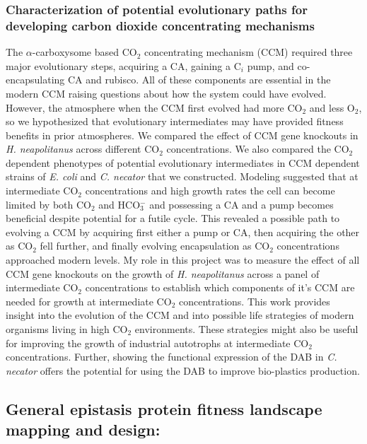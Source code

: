\documentclass{article}
\begin{document}
\subsubsection{Characterization of potential evolutionary paths for developing carbon dioxide concentrating mechanisms}
The $\alpha$-carboxysome based CO$_2$ concentrating mechanism (CCM) required three major evolutionary steps, acquiring a CA, gaining a C$_i$ pump, and co-encapsulating CA and rubisco.
All of these components are essential in the modern CCM raising questions about how the system could have evolved.
However, the atmosphere when the CCM first evolved had more CO$_2$ and less O$_2$, so we hypothesized that evolutionary intermediates may have provided fitness benefits in prior atmospheres.
We compared the effect of CCM gene knockouts in \textit{H. neapolitanus} across different CO$_2$ concentrations.
We also compared the CO$_2$ dependent phenotypes of potential evolutionary intermediates in CCM dependent strains of \textit{E. coli} and \textit{C. necator} that we constructed.
Modeling suggested that at intermediate CO$_2$ concentrations and high growth rates the cell can become limited by both CO$_2$ and HCO$_{3}^{-}$ and possessing a CA and a pump becomes beneficial despite potential for a futile cycle.
This revealed a possible path to evolving a CCM by acquiring first either a pump or CA, then acquiring the other as CO$_2$ fell further, and finally evolving encapsulation as CO$_2$ concentrations approached modern levels.
My role in this project was to measure the effect of all CCM gene knockouts on the growth of \textit{H. neapolitanus} across a panel of intermediate CO$_2$ concentrations to establish which components of it's CCM are needed for growth at intermediate CO$_2$ concentrations.
This work provides insight into the evolution of the CCM and into possible life strategies of modern organisms living in high CO$_2$ environments.
These strategies might also be useful for improving the growth of industrial autotrophs at intermediate CO$_2$ concentrations.
Further, showing the functional expression of the DAB in \textit{C. necator} offers the potential for using the DAB to improve bio-plastics production.

%
\nocite{Flamholz2022-yo}
\printbibliography[heading=none]

\leavevmode\pagebreak

\subsection{General epistasis protein fitness landscape mapping and design:}
\end{document}
